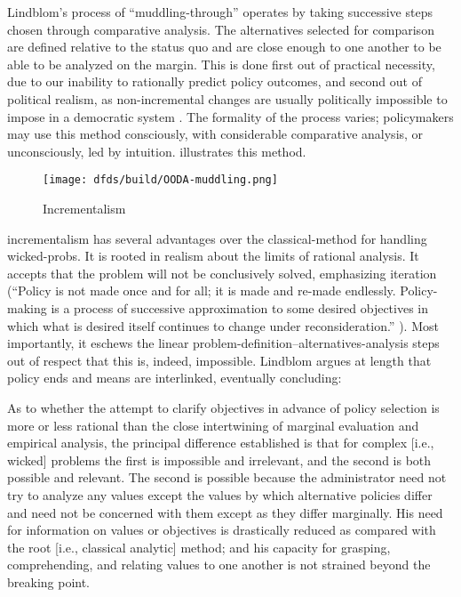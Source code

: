 Lindblom's process of ``\ac{muddling-through}'' operates by taking successive steps chosen through comparative analysis.
The alternatives selected for comparison are defined relative to the status quo and are close enough to one another to
be able to be analyzed on the margin. This is done first out of practical necessity, due to our inability to rationally
predict policy outcomes, and second out of political realism, as non-incremental changes are usually politically
impossible to impose in a democratic system \cite{lindblom_muddling_1959}. The formality of the process varies;
policymakers may use this method consciously, with considerable comparative analysis, or unconsciously, led by
intuition.  illustrates this method.


\begin{figure}[h]
  \centering\CaptionFontSize
  \texttt{[image: dfds/build/OODA-muddling.png]}
  \caption{Incrementalism}
  \label{fig-muddling-through}
\end{figure}

\Ac{incrementalism} has several advantages over the \ac{classical-method} for handling \acp{wicked-prob}. It is rooted
in realism about the limits of rational analysis. It accepts that the problem will not be conclusively solved,
emphasizing iteration (``Policy is not made once and for all; it is made and re-made endlessly. Policy-making is a
process of successive approximation to some desired objectives in which what is desired itself continues to change under
reconsideration.'' \cite{lindblom_muddling_1959}). Most importantly, it eschews the linear
problem-definition--alternatives-analysis steps out of respect that this is, indeed, impossible. Lindblom argues at
length that policy ends and means are interlinked, eventually concluding:

\begin{displayquote}
As to whether the attempt to clarify objectives in advance of policy selection is more or less rational than the close
intertwining of marginal evaluation and empirical analysis, the principal difference established is that for complex
[i.e., wicked] problems the first is impossible and irrelevant, and the second is both possible and relevant. The second
is possible because the administrator need not try to analyze any values except the values by which alternative policies
differ and need not be concerned with them except as they differ marginally. His need for information on values or
objectives is drastically reduced as compared with the root [i.e., classical analytic] method; and his capacity for
grasping, comprehending, and relating values to one another is not strained beyond the breaking point.
\cite{lindblom_muddling_1959}
\end{displayquote}

